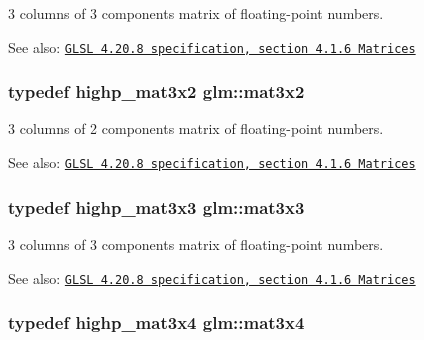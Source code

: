 3 columns of 3 components matrix of floating-point numbers.

\begin{Desc}
\item[See also:]\href{http://www.opengl.org/registry/doc/GLSLangSpec.4.20.8.pdf}{\tt GLSL 4.20.8 specification, section 4.1.6 Matrices} \end{Desc}
\hypertarget{group__core__types_gd7476e0e866186f12ee87975c6b01552}{
\subsubsection[mat3x2]{\setlength{\rightskip}{0pt plus 5cm}typedef highp\_\-mat3x2 {\bf glm::mat3x2}}}
\label{group__core__types_gd7476e0e866186f12ee87975c6b01552}


3 columns of 2 components matrix of floating-point numbers.

\begin{Desc}
\item[See also:]\href{http://www.opengl.org/registry/doc/GLSLangSpec.4.20.8.pdf}{\tt GLSL 4.20.8 specification, section 4.1.6 Matrices} \end{Desc}
\hypertarget{group__core__types_g6fecca6a869070b6bf8acb44ce1c2af3}{
\subsubsection[mat3x3]{\setlength{\rightskip}{0pt plus 5cm}typedef highp\_\-mat3x3 {\bf glm::mat3x3}}}
\label{group__core__types_g6fecca6a869070b6bf8acb44ce1c2af3}


3 columns of 3 components matrix of floating-point numbers.

\begin{Desc}
\item[See also:]\href{http://www.opengl.org/registry/doc/GLSLangSpec.4.20.8.pdf}{\tt GLSL 4.20.8 specification, section 4.1.6 Matrices} \end{Desc}
\hypertarget{group__core__types_g5524ae15d7fc00a68b8e0e3a0733cc2a}{
\subsubsection[mat3x4]{\setlength{\rightskip}{0pt plus 5cm}typedef highp\_\-mat3x4 {\bf glm::mat3x4}}}
\label{group__core__types_g5524ae15d7fc00a68b8e0e3a0733cc2a}


